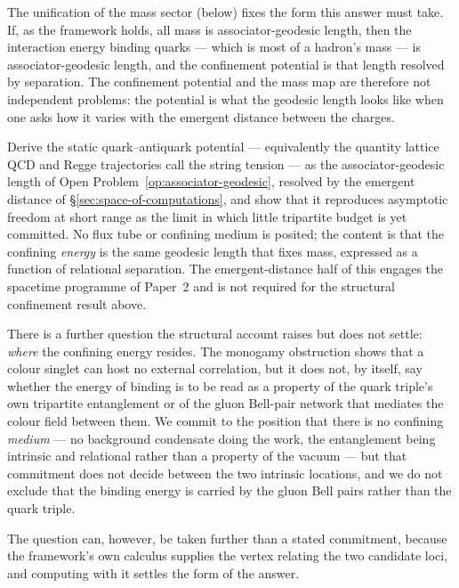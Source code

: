 The unification of the mass sector (below) fixes the form this answer must take. If, as the framework
holds, all mass is associator-geodesic length, then the interaction energy binding quarks --- which
is most of a hadron's mass --- is associator-geodesic length, and the confinement potential is that
length resolved by separation. The confinement potential and the mass map are therefore not
independent problems: the potential is what the geodesic length looks like when one asks how it
varies with the emergent distance between the charges.

\begin{openproblem}\label{op:confinement-potential}
Derive the static quark--antiquark potential --- equivalently the quantity lattice QCD and Regge
trajectories call the string tension --- as the associator-geodesic length of
Open Problem~\ref{op:associator-geodesic}, resolved by the emergent distance of
\S\ref{sec:space-of-computations}, and show that it reproduces asymptotic freedom at short range as the limit in
which little tripartite budget is yet committed. No flux tube or confining medium is posited; the
content is that the confining \emph{energy} is the same geodesic length that fixes mass, expressed as
a function of relational separation. The emergent-distance half of this engages the spacetime
programme of Paper~2 and is not required for the structural confinement result above.
\end{openproblem}

There is a further question the structural account raises but does not settle: \emph{where} the
confining energy resides. The monogamy obstruction shows that a colour singlet can host no external
correlation, but it does not, by itself, say whether the energy of binding is to be read as a
property of the quark triple's own tripartite entanglement or of the gluon Bell-pair network that
mediates the colour field between them. We commit to the position that there is no confining
\emph{medium} --- no background condensate doing the work, the entanglement being intrinsic and
relational rather than a property of the vacuum --- but that commitment does not decide between the
two intrinsic locations, and we do not exclude that the binding energy is carried by the gluon Bell
pairs rather than the quark triple.

The question can, however, be taken further than a stated commitment, because the framework's own
calculus supplies the vertex relating the two candidate loci, and computing with it settles the
form of the answer.

